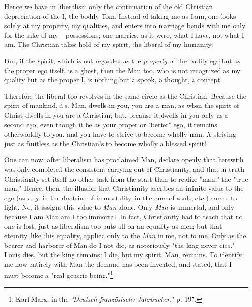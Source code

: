 \documentclass[a4paper]{book}
\begin{document}
Hence we have in liberalism only the continuation of the old Christian 
depreciation of the I, the bodily Tom. Instead of taking me as I am, one looks 
solely at my property, my qualities, and enters into marriage bonds with me 
only for the sake of my -- possessions; one marries, as it were, what I have, 
not what I am. The Christian takes hold of my spirit, the liberal of my 
humanity.

But, if the spirit, which is not regarded as the \textit{property} of the 
bodily ego but as the proper ego itself, is a ghost, then the Man too, who is 
not recognized as my quality but as the proper I, is nothing but a spook, a 
thought, a concept.

Therefore the liberal too revolves in the same circle as the Christian. 
Because the spirit of mankind, \textit{i.e.} Man, dwells in you, you are a 
man, as when the spirit of Christ dwells in you are a Christian; but, because 
it dwells in you only as a second ego, even though it be as your proper or 
"{}better"{} ego, it remains otherworldly to you, and you have to strive to 
become wholly man. A striving just as fruitless as the Christian's to become 
wholly a blessed spirit!

One can now, after liberalism has proclaimed Man, declare openly that herewith 
was only completed the consistent carrying out of Christianity, and that in 
truth Christianity set itself no other task from the start than to realize 
"{}man,"{} the "{}true man."{} Hence, then, the illusion that Christianity 
ascribes an infinite value to the ego (as \textit{e. g.} in the doctrine of 
immortality, in the cure of souls, etc.) comes to light. No, it assigns this 
value to \textit{Man} alone. Only \textit{Man} is immortal, and only because I 
am Man am I too immortal. In fact, Christianity had to teach that no one is 
lost, just as liberalism too puts all on an equality as men; but that 
eternity, like this equality, applied only to the \textit{Man} in me, not to 
me. Only as the bearer and harborer of Man do I not die, as notoriously "{}the 
king never dies."{} Louis dies, but the king remains; I die, but my spirit, 
Man, remains. To identify me now entirely with Man the demand has been 
invented, and stated, that I must become a "{}real generic 
being."{}\footnote{Karl Marx, in the \textit{"{}Deutsch-franz\"osische 
Jahrbucher},"{} p. 197.}
\end{document}
